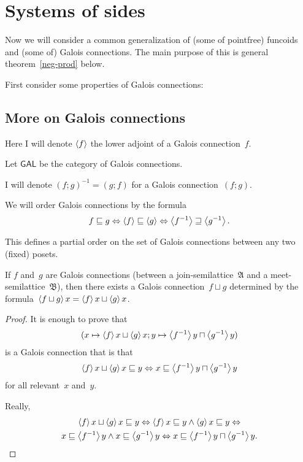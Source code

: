 \chapter{Systems of sides}

Now we will consider a common generalization of (some of pointfree) funcoids and (some of) Galois connections.
The main purpose of this is general theorem~\ref{neg-prod} below.

First consider some properties of Galois connections:

\section{More on Galois connections}

Here I will denote $\left\langle f\right\rangle$ the lower adjoint of a Galois connection~$f$. 

Let $\mathsf{GAL}$ be the category of Galois connections.

I will denote $(f;g)^{-1}=(g;f)$ for a Galois connection~$(f;g)$.

We will order Galois connections by the formula
\[ f\sqsubseteq g \Leftrightarrow \left\langle f\right\rangle\sqsubseteq\left\langle g\right\rangle \Leftrightarrow \left\langle f^{-1}\right\rangle\sqsupseteq\left\langle g^{-1}\right\rangle. \]

\begin{obvious}
This defines a partial order on the set of Galois connections between any two (fixed) posets.
\end{obvious}

\begin{prop}\label{gal-fjoin-x}
If $f$ and~$g$ are Galois connections (between a join-semilattice~$\mathfrak{A}$ and a meet-semilattice~$\mathfrak{B}$),
then there exists a Galois connection~$f\sqcup g$
determined by the formula~$\left\langle f\sqcup g\right\rangle x = \left\langle f\right\rangle x\sqcup\left\langle g\right\rangle x$.
\end{prop}

\begin{proof}
It is enough to prove that
\[ (x\mapsto\left\langle f\right\rangle x\sqcup\left\langle g\right\rangle x; y\mapsto\left\langle f^{-1}\right\rangle y\sqcap\left\langle g^{-1}\right\rangle y) \]
is a Galois connection that is that
\[ \left\langle f\right\rangle x\sqcup\left\langle g\right\rangle x\sqsubseteq y\Leftrightarrow x\sqsubseteq\left\langle f^{-1}\right\rangle y\sqcap\left\langle g^{-1}\right\rangle y \] for all relevant~$x$ and~$y$.

Really,
\begin{multline*}
\left\langle f\right\rangle x\sqcup\left\langle g\right\rangle x\sqsubseteq y \Leftrightarrow
\left\langle f\right\rangle x\sqsubseteq y\land\left\langle g\right\rangle x\sqsubseteq y \Leftrightarrow \\
x\sqsubseteq\left\langle f^{-1}\right\rangle y\land x\sqsubseteq\left\langle g^{-1}\right\rangle y \Leftrightarrow
x\sqsubseteq\left\langle f^{-1}\right\rangle y\sqcap\left\langle g^{-1}\right\rangle y.
\end{multline*}
\end{proof}

